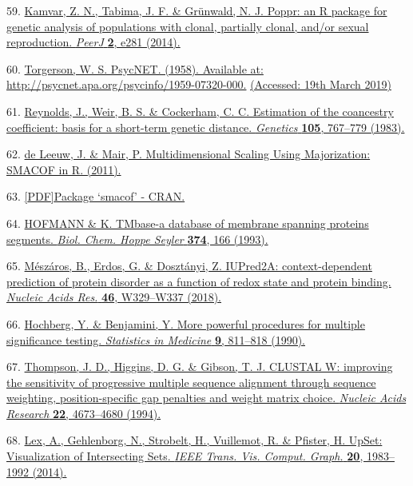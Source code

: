\documentclass[
]{article}
\begin{document}
59. \href{http://paperpile.com/b/REZjPf/TEfJA}{Kamvar, Z. N., Tabima, J.
F. \& Grünwald, N. J. Poppr: an R package for genetic analysis of
populations with clonal, partially clonal, and/or sexual reproduction.
\emph{PeerJ} \textbf{2}, e281 (2014).}

60. \href{http://paperpile.com/b/REZjPf/0m4TS}{Torgerson, W. S. PsycNET.
(1958). Available at:}
\url{http://psycnet.apa.org/psycinfo/1959-07320-000.}
\href{http://paperpile.com/b/REZjPf/0m4TS}{(Accessed: 19th March 2019)}

61. \href{http://paperpile.com/b/REZjPf/8bj1M}{Reynolds, J., Weir, B. S.
\& Cockerham, C. C. Estimation of the coancestry coefficient: basis for
a short-term genetic distance. \emph{Genetics} \textbf{105}, 767--779
(1983).}

62. \href{http://paperpile.com/b/REZjPf/gUxkc}{de Leeuw, J. \& Mair, P.
Multidimensional Scaling Using Majorization: SMACOF in R. (2011).}

63. \href{http://paperpile.com/b/REZjPf/dJiR3}{{[}PDF{]}Package `smacof'
- CRAN.}

64. \href{http://paperpile.com/b/REZjPf/pdAby}{HOFMANN \& K. TMbase-a
database of membrane spanning proteins segments. \emph{Biol. Chem. Hoppe
Seyler} \textbf{374}, 166 (1993).}

65. \href{http://paperpile.com/b/REZjPf/GYlhT}{Mészáros, B., Erdos, G.
\& Dosztányi, Z. IUPred2A: context-dependent prediction of protein
disorder as a function of redox state and protein binding. \emph{Nucleic
Acids Res.} \textbf{46}, W329--W337 (2018).}

66. \href{http://paperpile.com/b/REZjPf/lMDMS}{Hochberg, Y. \&
Benjamini, Y. More powerful procedures for multiple significance
testing. \emph{Statistics in Medicine} \textbf{9}, 811--818 (1990).}

67. \href{http://paperpile.com/b/REZjPf/gK8Xk}{Thompson, J. D., Higgins,
D. G. \& Gibson, T. J. CLUSTAL W: improving the sensitivity of
progressive multiple sequence alignment through sequence weighting,
position-specific gap penalties and weight matrix choice. \emph{Nucleic
Acids Research} \textbf{22}, 4673--4680 (1994).}

68. \href{http://paperpile.com/b/REZjPf/PH7pe}{Lex, A., Gehlenborg, N.,
Strobelt, H., Vuillemot, R. \& Pfister, H. UpSet: Visualization of
Intersecting Sets. \emph{IEEE Trans. Vis. Comput. Graph.} \textbf{20},
1983--1992 (2014).}
\end{document}
